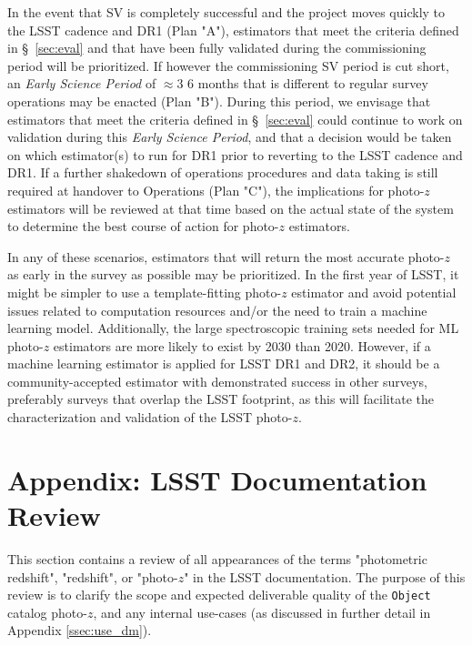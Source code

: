 \documentclass[DM,lsstdraft,toc]{lsstdoc}
\begin{document}
In the event that SV is completely successful and the project moves quickly to the LSST cadence and DR1 (Plan "A"), estimators that  meet the criteria defined in \S~\ref{sec:eval} and that have been fully validated during the commissioning period will be prioritized. 
If however the commissioning SV period is cut short, an {\it Early Science Period} of $\approx$3\,\textendash\,6 months that is different to regular survey operations may be enacted (Plan "B"). During this period, we envisage that estimators that meet the criteria defined in \S~\ref{sec:eval} could continue to work on validation during this {\it Early Science Period}, and that a decision would be taken on which estimator(s) to run for DR1 prior to reverting to the LSST cadence and DR1. 
If a further shakedown of operations procedures and data taking is still required at handover to Operations (Plan "C"), the implications for photo-$z$ estimators will be reviewed at that time based on the actual state of the system to determine the best course of action for photo-$z$ estimators. 

In any of these scenarios,  estimators that will return the most accurate photo-$z$ as early in the survey as possible may be prioritized.
In the first year of LSST, it might be simpler to use a template-fitting photo-$z$ estimator and avoid potential issues related to computation resources and/or the need to train a machine learning model.
Additionally, the large spectroscopic training sets needed for ML photo-$z$ estimators are more likely to exist by 2030 than 2020.
However, if a machine learning estimator is applied for LSST DR1 and DR2, it should be a community-accepted estimator with demonstrated success in other surveys, preferably surveys that overlap the LSST footprint, as this will facilitate the characterization and validation of the LSST photo-$z$.


\clearpage
\section{Appendix: LSST Documentation Review}\label{sec:docs}

This section contains a review of all appearances of the terms "photometric redshift", "redshift", or "photo-$z$" in the LSST documentation.
The purpose of this review is to clarify the scope and expected deliverable quality of the {\tt Object} catalog photo-$z$, and any internal use-cases (as discussed in further detail in Appendix \ref{ssec:use_dm}).
\end{document}
